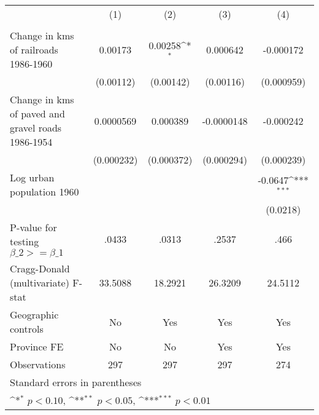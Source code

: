 {
\def\sym#1{\ifmmode^{#1}\else\(^{#1}\)\fi}
\begin{tabular}{l*{4}{c}}
\hline\hline
                &\multicolumn{1}{c}{(1)}&\multicolumn{1}{c}{(2)}&\multicolumn{1}{c}{(3)}&\multicolumn{1}{c}{(4)}\\
                &\multicolumn{1}{c}{}&\multicolumn{1}{c}{}&\multicolumn{1}{c}{}&\multicolumn{1}{c}{}\\
\hline
Change in kms of railroads 1986-1960&  0.00173         &  0.00258\sym{*}  & 0.000642         &-0.000172         \\
                &(0.00112)         &(0.00142)         &(0.00116)         &(0.000959)         \\
[1em]
Change in kms of paved and gravel roads 1986-1954&0.0000569         & 0.000389         &-0.0000148         &-0.000242         \\
                &(0.000232)         &(0.000372)         &(0.000294)         &(0.000239)         \\
[1em]
Log urban population 1960&                  &                  &                  &  -0.0647\sym{***}\\
                &                  &                  &                  & (0.0218)         \\
\hline
P-value for testing $\beta\_{2} >= \beta\_{1}$&    .0433         &    .0313         &    .2537         &     .466         \\
Cragg-Donald (multivariate) F-stat&  33.5088         &  18.2921         &  26.3209         &  24.5112         \\
Geographic controls&       No         &      Yes         &      Yes         &      Yes         \\
Province FE     &       No         &       No         &      Yes         &      Yes         \\
Observations    &      297         &      297         &      297         &      274         \\
\hline\hline
\multicolumn{5}{l}{\footnotesize Standard errors in parentheses}\\
\multicolumn{5}{l}{\footnotesize \sym{*} \(p<0.10\), \sym{**} \(p<0.05\), \sym{***} \(p<0.01\)}\\
\end{tabular}
}
